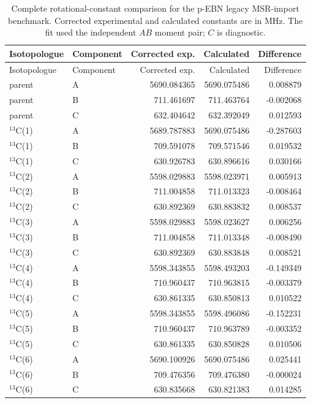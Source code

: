\begin{longtable}{llrrr}
\caption{Complete rotational-constant comparison for the p-EBN legacy MSR-import benchmark. Corrected experimental and calculated constants are in MHz. The fit used the independent $AB$ moment pair; $C$ is diagnostic.}\label{tab:si-p-ebn-rotconstants}\\
\toprule
Isotopologue & Component & Corrected exp. & Calculated & Difference \\
\midrule
\endfirsthead
\toprule
Isotopologue & Component & Corrected exp. & Calculated & Difference \\
\midrule
\endhead
parent & A & 5690.084365 & 5690.075486 & 0.008879 \\
parent & B & 711.461697 & 711.463764 & -0.002068 \\
parent & C & 632.404642 & 632.392049 & 0.012593 \\
$^{13}$C(1) & A & 5689.787883 & 5690.075486 & -0.287603 \\
$^{13}$C(1) & B & 709.591078 & 709.571546 & 0.019532 \\
$^{13}$C(1) & C & 630.926783 & 630.896616 & 0.030166 \\
$^{13}$C(2) & A & 5598.029883 & 5598.023971 & 0.005913 \\
$^{13}$C(2) & B & 711.004858 & 711.013323 & -0.008464 \\
$^{13}$C(2) & C & 630.892369 & 630.883832 & 0.008537 \\
$^{13}$C(3) & A & 5598.029883 & 5598.023627 & 0.006256 \\
$^{13}$C(3) & B & 711.004858 & 711.013348 & -0.008490 \\
$^{13}$C(3) & C & 630.892369 & 630.883848 & 0.008521 \\
$^{13}$C(4) & A & 5598.343855 & 5598.493203 & -0.149349 \\
$^{13}$C(4) & B & 710.960437 & 710.963815 & -0.003379 \\
$^{13}$C(4) & C & 630.861335 & 630.850813 & 0.010522 \\
$^{13}$C(5) & A & 5598.343855 & 5598.496086 & -0.152231 \\
$^{13}$C(5) & B & 710.960437 & 710.963789 & -0.003352 \\
$^{13}$C(5) & C & 630.861335 & 630.850828 & 0.010506 \\
$^{13}$C(6) & A & 5690.100926 & 5690.075486 & 0.025441 \\
$^{13}$C(6) & B & 709.476356 & 709.476380 & -0.000024 \\
$^{13}$C(6) & C & 630.835668 & 630.821383 & 0.014285 \\

\end{longtable}
